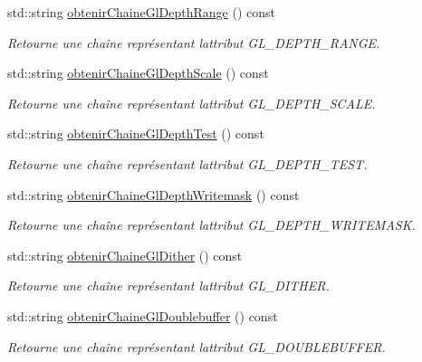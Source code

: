 \begin{DoxyCompactItemize}
std\+::string \hyperlink{group__utilitaire_ga9921b541644f4dc3b64a4ffd4a661a09}{obtenir\+Chaine\+Gl\+Depth\+Range} () const 
\begin{DoxyCompactList}\small\item\em Retourne une chaîne représentant l\textquotesingle{}attribut G\+L\+\_\+\+D\+E\+P\+T\+H\+\_\+\+R\+A\+N\+G\+E. \end{DoxyCompactList}\item 
std\+::string \hyperlink{group__utilitaire_ga4fac162003ef8c012c16ecd9041794ae}{obtenir\+Chaine\+Gl\+Depth\+Scale} () const 
\begin{DoxyCompactList}\small\item\em Retourne une chaîne représentant l\textquotesingle{}attribut G\+L\+\_\+\+D\+E\+P\+T\+H\+\_\+\+S\+C\+A\+L\+E. \end{DoxyCompactList}\item 
std\+::string \hyperlink{group__utilitaire_ga712bcce1fd6c63377d2b3c9c421f7559}{obtenir\+Chaine\+Gl\+Depth\+Test} () const 
\begin{DoxyCompactList}\small\item\em Retourne une chaîne représentant l\textquotesingle{}attribut G\+L\+\_\+\+D\+E\+P\+T\+H\+\_\+\+T\+E\+S\+T. \end{DoxyCompactList}\item 
std\+::string \hyperlink{group__utilitaire_gaec88db9c85bfd66909d3172982025862}{obtenir\+Chaine\+Gl\+Depth\+Writemask} () const 
\begin{DoxyCompactList}\small\item\em Retourne une chaîne représentant l\textquotesingle{}attribut G\+L\+\_\+\+D\+E\+P\+T\+H\+\_\+\+W\+R\+I\+T\+E\+M\+A\+S\+K. \end{DoxyCompactList}\item 
std\+::string \hyperlink{group__utilitaire_gabc6e75dad01908ff21a473d75483f691}{obtenir\+Chaine\+Gl\+Dither} () const 
\begin{DoxyCompactList}\small\item\em Retourne une chaîne représentant l\textquotesingle{}attribut G\+L\+\_\+\+D\+I\+T\+H\+E\+R. \end{DoxyCompactList}\item 
std\+::string \hyperlink{group__utilitaire_gae8239c45bba646389f06a6bdd49670f3}{obtenir\+Chaine\+Gl\+Doublebuffer} () const 
\begin{DoxyCompactList}\small\item\em Retourne une chaîne représentant l\textquotesingle{}attribut G\+L\+\_\+\+D\+O\+U\+B\+L\+E\+B\+U\+F\+F\+E\+R. \end{DoxyCompactList}\item 

\end{DoxyCompactItemize}
